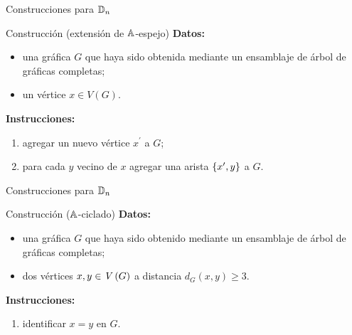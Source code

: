 \documentclass[spanish]{beamer}
\begin{document}
\begin{frame}{Construcciones para $\mathbb{D}_n$}
  \begin{block}{Construcción (extensión de $\mathbb{A}$-espejo)}
    \textbf{Datos:}
    \begin{itemize}[<+->]
      \item una gráfica $G$ que haya sido obtenida mediante un ensamblaje de 
      árbol de gráficas completas;
      \item un vértice $x\in V\left(G\right)$.
    \end{itemize}
    \textbf{Instrucciones:}
    \begin{enumerate}[<+->]
      \item agregar un nuevo vértice $x^\prime$ a $G$;
      \item para cada $y$ vecino de $x$ agregar una arista $\left\{{x^\prime, y}\right\}$ 
      a $G$.
    \end{enumerate}
  \end{block}
\end{frame}

\begin{frame}{Construcciones para $\mathbb{D}_n$}
  \begin{block}{Construcción ($\mathbb{A}$-ciclado)}
    \textbf{Datos:}
    \begin{itemize}[<+->]
      \item una gráfica $G$ que haya sido obtenido mediante un ensamblaje de 
      árbol de gráficas completas;
      \item dos vértices $x, y \in \mathit{V}\left({G}\right)$ a distancia $d_{G}\left(x, 
      y\right) \ge 3$.
    \end{itemize}
    \textbf{Instrucciones:}
    \begin{enumerate}[<+->]
      \item identificar $x = y$ en $G$.
    \end{enumerate}
  \end{block}
\end{frame}
\end{document}
